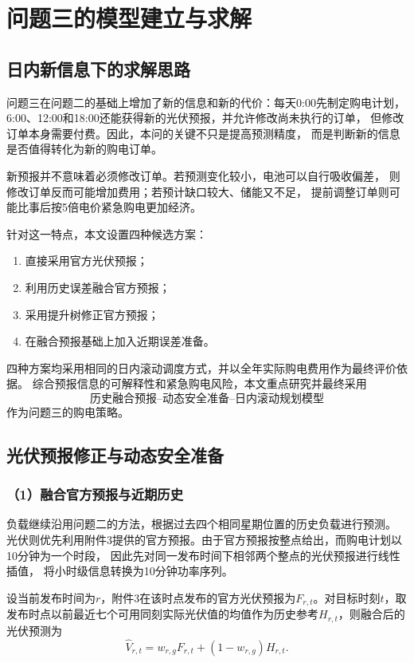 \section{问题三的模型建立与求解}

\subsection{日内新信息下的求解思路}

问题三在问题二的基础上增加了新的信息和新的代价：每天0:00先制定购电计划，
6:00、12:00和18:00还能获得新的光伏预报，并允许修改尚未执行的订单，
但修改订单本身需要付费。因此，本问的关键不只是提高预测精度，
而是判断新的信息是否值得转化为新的购电订单。

新预报并不意味着必须修改订单。若预测变化较小，电池可以自行吸收偏差，
则修改订单反而可能增加费用；若预计缺口较大、储能又不足，
提前调整订单则可能比事后按5倍电价紧急购电更加经济。

针对这一特点，本文设置四种候选方案：
\begin{enumerate}
    \item 直接采用官方光伏预报；
    \item 利用历史误差融合官方预报；
    \item 采用提升树修正官方预报；
    \item 在融合预报基础上加入近期误差准备。
\end{enumerate}

四种方案均采用相同的日内滚动调度方式，并以全年实际购电费用作为最终评价依据。
综合预报信息的可解释性和紧急购电风险，本文重点研究并最终采用
\[
\boxed{\text{历史融合预报--动态安全准备--日内滚动规划模型}}
\]
作为问题三的购电策略。


\subsection{光伏预报修正与动态安全准备}

\subsubsection*{（1）融合官方预报与近期历史}

负载继续沿用问题二的方法，根据过去四个相同星期位置的历史负载进行预测。
光伏则优先利用附件3提供的官方预报。由于官方预报按整点给出，而购电计划以10分钟为一个时段，
因此先对同一发布时间下相邻两个整点的光伏预报进行线性插值，
将小时级信息转换为10分钟功率序列。

设当前发布时间为$r$，附件3在该时点发布的官方光伏预报为$F_{r,t}$。对目标时刻$t$，取发布时点以前最近七个可用同刻实际光伏值的均值作为历史参考$H_{r,t}$，则融合后的光伏预测为
\begin{equation}
\widehat{V}_{r,t}
=
w_{r,g}F_{r,t}
+
(1-w_{r,g})H_{r,t}.
\end{equation}

